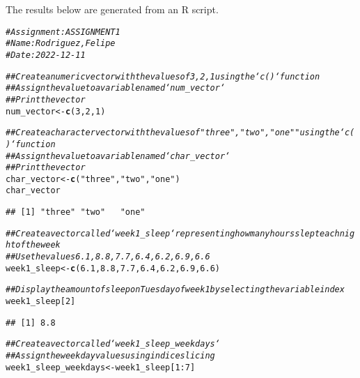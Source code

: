 \documentclass{article}\usepackage[]{graphicx}\usepackage[]{xcolor}
\makeatletter
\newcommand{\hlnum}[1]{\textcolor[rgb]{0.686,0.059,0.569}{#1}}%
\newcommand{\hlstr}[1]{\textcolor[rgb]{0.192,0.494,0.8}{#1}}%
\newcommand{\hlcom}[1]{\textcolor[rgb]{0.678,0.584,0.686}{\textit{#1}}}%
\newcommand{\hlopt}[1]{\textcolor[rgb]{0,0,0}{#1}}%
\newcommand{\hlstd}[1]{\textcolor[rgb]{0.345,0.345,0.345}{#1}}%
\newcommand{\hlkwb}[1]{\textcolor[rgb]{0.69,0.353,0.396}{#1}}%
\newcommand{\hlkwd}[1]{\textcolor[rgb]{0.737,0.353,0.396}{\textbf{#1}}}%
\newenvironment{kframe}{%
 \def\at@end@of@kframe{}%
 \ifinner\ifhmode%
  \def\at@end@of@kframe{\end{minipage}}%
  \begin{minipage}{\columnwidth}%
 \fi\fi%
 \def\FrameCommand##1{\hskip\@totalleftmargin \hskip-\fboxsep
 \colorbox{shadecolor}{##1}\hskip-\fboxsep
     \hskip-\linewidth \hskip-\@totalleftmargin \hskip\columnwidth}%
 \MakeFramed {\advance\hsize-\width
   \@totalleftmargin\z@ \linewidth\hsize
   \@setminipage}}%
 {\par\unskip\endMakeFramed%
 \at@end@of@kframe}
\newenvironment{knitrout}{}{} %
\makeatother
\begin{document}
\title{\title{\title{\title{\title{\title{\title{}}}}}}}



\maketitle
The results below are generated from an R script.

\begin{knitrout}
\color{fgcolor}\begin{kframe}
\begin{alltt}
\hlcom{# Assignment: ASSIGNMENT 1}
\hlcom{# Name: Rodriguez, Felipe}
\hlcom{# Date: 2022-12-11}

\hlcom{## Create a numeric vector with the values of 3, 2, 1 using the `c()` function}
\hlcom{## Assign the value to a variable named `num_vector`}
\hlcom{## Print the vector}
\hlstd{num_vector} \hlkwb{<-} \hlkwd{c}\hlstd{(}\hlnum{3}\hlstd{,} \hlnum{2}\hlstd{,} \hlnum{1}\hlstd{)}

\hlcom{## Create a character vector with the values of "three", "two", "one" "using the `c()` function}
\hlcom{## Assign the value to a variable named `char_vector`}
\hlcom{## Print the vector}
\hlstd{char_vector} \hlkwb{<-} \hlkwd{c}\hlstd{(}\hlstr{"three"}\hlstd{,} \hlstr{"two"}\hlstd{,} \hlstr{"one"}\hlstd{)}
\hlstd{char_vector}
\end{alltt}
\begin{verbatim}
## [1] "three" "two"   "one"
\end{verbatim}
\begin{alltt}
\hlcom{## Create a vector called `week1_sleep` representing how many hours slept each night of the week}
\hlcom{## Use the values 6.1, 8.8, 7.7, 6.4, 6.2, 6.9, 6.6}
\hlstd{week1_sleep} \hlkwb{<-} \hlkwd{c}\hlstd{(}\hlnum{6.1}\hlstd{,} \hlnum{8.8}\hlstd{,} \hlnum{7.7}\hlstd{,} \hlnum{6.4}\hlstd{,} \hlnum{6.2}\hlstd{,} \hlnum{6.9}\hlstd{,} \hlnum{6.6}\hlstd{)}

\hlcom{## Display the amount of sleep on Tuesday of week 1 by selecting the variable index}
\hlstd{week1_sleep[}\hlnum{2}\hlstd{]}
\end{alltt}
\begin{verbatim}
## [1] 8.8
\end{verbatim}
\begin{alltt}
\hlcom{## Create a vector called `week1_sleep_weekdays`}
\hlcom{## Assign the weekday values using indice slicing}
\hlstd{week1_sleep_weekdays} \hlkwb{<-} \hlstd{week1_sleep[}\hlnum{1}\hlopt{:}\hlnum{7}\hlstd{]}


\end{alltt}
\end{kframe}
\end{knitrout}
\end{document}
